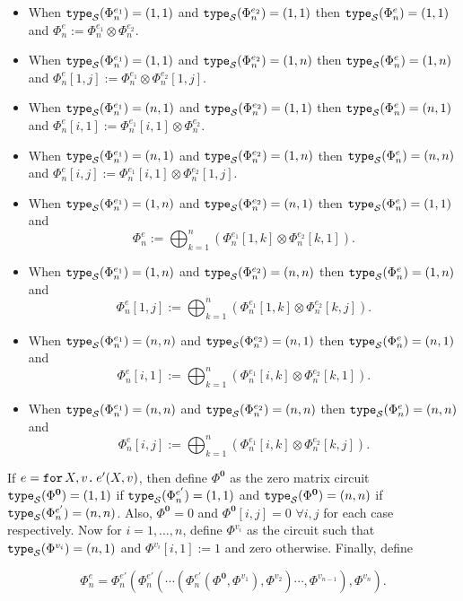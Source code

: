 \begin{itemize}
	\item When $\texttt{type}_{\mathcal{S}}(\Phi^{e_1}_n)=(1,1)$ and $\texttt{type}_{\mathcal{S}}(\Phi^{e_2}_n)=(1, 1)$ then $\texttt{type}_{\mathcal{S}}(\Phi^{e}_n)=(1, 1)$ and $\Phi^{e}_n:=\Phi^{e_1}_n \otimes \Phi^{e_2}_n$.
  \item When $\texttt{type}_{\mathcal{S}}(\Phi^{e_1}_n)=(1,1)$ and $\texttt{type}_{\mathcal{S}}(\Phi^{e_2}_n)=(1, n)$ then $\texttt{type}_{\mathcal{S}}(\Phi^{e}_n)=(1, n)$ and $\Phi^{e}_n[1,j]:=\Phi^{e_1}_n \otimes \Phi^{e_2}_n[1,j]$.
  \item When $\texttt{type}_{\mathcal{S}}(\Phi^{e_1}_n)=(n,1)$ and $\texttt{type}_{\mathcal{S}}(\Phi^{e_2}_n)=(1, 1)$ then $\texttt{type}_{\mathcal{S}}(\Phi^{e}_n)=(n, 1)$ and $\Phi^{e}_n[i,1]:=\Phi^{e_1}_n[i,1] \otimes \Phi^{e_2}_n$.
  \item When $\texttt{type}_{\mathcal{S}}(\Phi^{e_1}_n)=(n,1)$ and $\texttt{type}_{\mathcal{S}}(\Phi^{e_2}_n)=(1, n)$ then $\texttt{type}_{\mathcal{S}}(\Phi^{e}_n)=(n, n)$ and $\Phi^{e}_n[i,j]:=\Phi^{e_1}_n[i,1] \otimes \Phi^{e_2}_n[1,j]$.
  \item When $\texttt{type}_{\mathcal{S}}(\Phi^{e_1}_n)=(1,n)$ and $\texttt{type}_{\mathcal{S}}(\Phi^{e_2}_n)=(n, 1)$ then $\texttt{type}_{\mathcal{S}}(\Phi^{e}_n)=(1, 1)$ and $$\Phi^{e}_n:=\bigoplus_{k=1}^n \left( \Phi^{e_1}_n[1,k] \otimes \Phi^{e_2}_n[k,1] \right).$$
  \item When $\texttt{type}_{\mathcal{S}}(\Phi^{e_1}_n)=(1,n)$ and $\texttt{type}_{\mathcal{S}}(\Phi^{e_2}_n)=(n, n)$ then $\texttt{type}_{\mathcal{S}}(\Phi^{e}_n)=(1, n)$ and $$\Phi^{e}_n[1,j]:=\bigoplus_{k=1}^n \left( \Phi^{e_1}_n[1,k] \otimes \Phi^{e_2}_n[k,j] \right).$$
  \item When $\texttt{type}_{\mathcal{S}}(\Phi^{e_1}_n)=(n,n)$ and $\texttt{type}_{\mathcal{S}}(\Phi^{e_2}_n)=(n, 1)$ then $\texttt{type}_{\mathcal{S}}(\Phi^{e}_n)=(n, 1)$ and $$\Phi^{e}_n[i,1]:=\bigoplus_{k=1}^n \left( \Phi^{e_1}_n[i,k] \otimes \Phi^{e_2}_n[k,1] \right).$$
  \item When $\texttt{type}_{\mathcal{S}}(\Phi^{e_1}_n)=(n,n)$ and $\texttt{type}_{\mathcal{S}}(\Phi^{e_2}_n)=(n, n)$ then $\texttt{type}_{\mathcal{S}}(\Phi^{e}_n)=(n, n)$ and $$\Phi^{e}_n[i,j]:=\bigoplus_{k=1}^n \left( \Phi^{e_1}_n[i,k] \otimes \Phi^{e_2}_n[k,j] \right).$$
\end{itemize}

If $e=\texttt{for}\, X,v \texttt{.}\, e'(X, v)$, then define $\Phi^{\mathbf{0}}$ 
as the zero matrix circuit $\texttt{type}_{\mathcal{S}}(\Phi^{\mathbf{0}})=(1,1)$ if $\texttt{type}_{\mathcal{S}}(\Phi^{e'}_n)=(1,1)$ and 
$\texttt{type}_{\mathcal{S}}(\Phi^{\mathbf{0}})=(n,n)$ if $\texttt{type}_{\mathcal{S}}(\Phi^{e'}_n)=(n,n)$. Also, $\Phi^{\mathbf{0}}=0$ and
$\Phi^{\mathbf{0}}[i,j]=0$ $\forall i,j$ for each case respectively. Now for $i=1,\ldots, n$, define
$\Phi^{v_i}$ as the circuit such that $\texttt{type}_{\mathcal{S}}(\Phi^{v_i})=(n,1)$ and $\Phi^{v_i}[i,1]:=1$ and zero otherwise.
Finally, define

$$\Phi^{e}_n=\Phi^{e'}_n\left( \Phi^{e'}_n \left( \cdots \left( \Phi^{e'}_n\left( \Phi^{\mathbf{0}}, \Phi^{v_1}\right), \Phi^{v_2}\right)\cdots, \Phi^{v_{n-1}} \right), \Phi^{v_n} \right).$$

